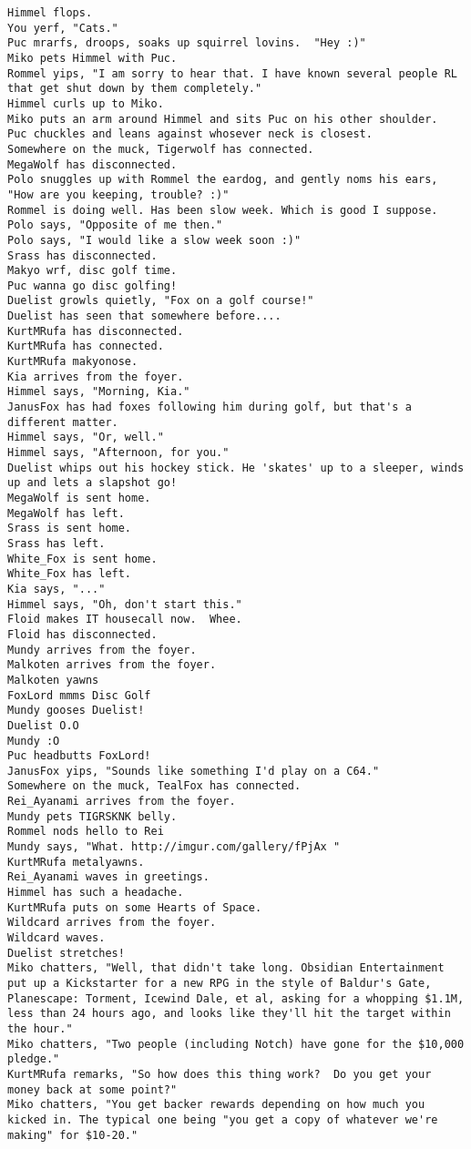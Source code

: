 \begin{verbatim}
Himmel flops.
You yerf, "Cats."
Puc mrarfs, droops, soaks up squirrel lovins.  "Hey :)"
Miko pets Himmel with Puc.
Rommel yips, "I am sorry to hear that. I have known several people RL that get shut down by them completely."
Himmel curls up to Miko.
Miko puts an arm around Himmel and sits Puc on his other shoulder.
Puc chuckles and leans against whosever neck is closest.
Somewhere on the muck, Tigerwolf has connected.
MegaWolf has disconnected.
Polo snuggles up with Rommel the eardog, and gently noms his ears, "How are you keeping, trouble? :)"
Rommel is doing well. Has been slow week. Which is good I suppose.
Polo says, "Opposite of me then."
Polo says, "I would like a slow week soon :)"
Srass has disconnected.
Makyo wrf, disc golf time.
Puc wanna go disc golfing!
Duelist growls quietly, "Fox on a golf course!"
Duelist has seen that somewhere before....
KurtMRufa has disconnected.
KurtMRufa has connected.
KurtMRufa makyonose.
Kia arrives from the foyer.
Himmel says, "Morning, Kia."
JanusFox has had foxes following him during golf, but that's a different matter.
Himmel says, "Or, well."
Himmel says, "Afternoon, for you."
Duelist whips out his hockey stick. He 'skates' up to a sleeper, winds up and lets a slapshot go!
MegaWolf is sent home.
MegaWolf has left.
Srass is sent home.
Srass has left.
White_Fox is sent home.
White_Fox has left.
Kia says, "..."
Himmel says, "Oh, don't start this."
Floid makes IT housecall now.  Whee.
Floid has disconnected.
Mundy arrives from the foyer.
Malkoten arrives from the foyer.
Malkoten yawns
FoxLord mmms Disc Golf
Mundy gooses Duelist!
Duelist O.O
Mundy :O
Puc headbutts FoxLord!
JanusFox yips, "Sounds like something I'd play on a C64."
Somewhere on the muck, TealFox has connected.
Rei_Ayanami arrives from the foyer.
Mundy pets TIGRSKNK belly.
Rommel nods hello to Rei
Mundy says, "What. http://imgur.com/gallery/fPjAx "
KurtMRufa metalyawns.
Rei_Ayanami waves in greetings.
Himmel has such a headache.
KurtMRufa puts on some Hearts of Space.
Wildcard arrives from the foyer.
Wildcard waves.
Duelist stretches!
Miko chatters, "Well, that didn't take long. Obsidian Entertainment put up a Kickstarter for a new RPG in the style of Baldur's Gate, Planescape: Torment, Icewind Dale, et al, asking for a whopping $1.1M, less than 24 hours ago, and looks like they'll hit the target within the hour."
Miko chatters, "Two people (including Notch) have gone for the $10,000 pledge."
KurtMRufa remarks, "So how does this thing work?  Do you get your money back at some point?"
Miko chatters, "You get backer rewards depending on how much you kicked in. The typical one being "you get a copy of whatever we're making" for $10-20."

\end{verbatim}
